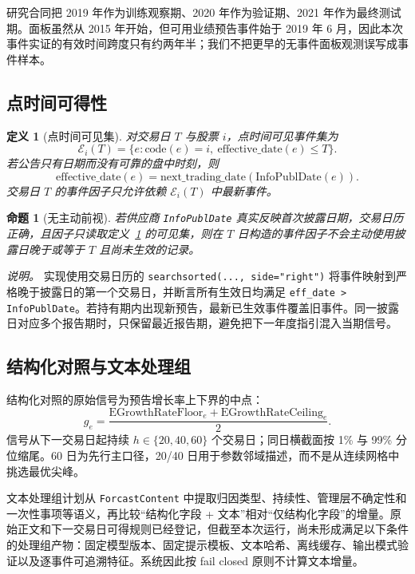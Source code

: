 \documentclass[UTF8,zihao=-4]{ctexart}
\newcommand{\code}[1]{\texttt{#1}}
\theoremstyle{accentthm}
\newtheorem{definition}{定义}
\newtheorem{proposition}{命题}
\begin{document}
研究合同把 2019 年作为训练观察期、2020 年作为验证期、2021 年作为最终测试期。面板虽然从 2015 年开始，但可用业绩预告事件始于 2019 年 6 月，因此本次事件实证的有效时间跨度只有约两年半；我们不把更早的无事件面板观测误写成事件样本。

\subsection{点时间可得性}

\begin{definition}[点时间可见集]\label{def:pit}
对交易日 $T$ 与股票 $i$，点时间可见事件集为
\[
  \mathcal{E}_{i}(T)=
  \{e:\text{code}(e)=i,\ \text{effective\_date}(e)\le T\}.
\]
若公告只有日期而没有可靠的盘中时刻，则
\[
  \text{effective\_date}(e)=
  \text{next\_trading\_date}(\text{InfoPublDate}(e)).
\]
交易日 $T$ 的事件因子只允许依赖 $\mathcal{E}_{i}(T)$ 中最新事件。
\end{definition}

\begin{proposition}[无主动前视]\label{prop:noleak}
若供应商 \code{InfoPublDate} 真实反映首次披露日期，交易日历正确，且因子只读取定义~\ref{def:pit} 的可见集，则在 $T$ 日构造的事件因子不会主动使用披露日晚于或等于 $T$ 且尚未生效的记录。
\end{proposition}

\noindent\emph{说明。} 实现使用交易日历的 \code{searchsorted(..., side="right")} 将事件映射到严格晚于披露日的第一个交易日，并断言所有生效日均满足 \code{eff\_date > InfoPublDate}。若持有期内出现新预告，最新已生效事件覆盖旧事件。同一披露日对应多个报告期时，只保留最近报告期，避免把下一年度指引混入当期信号。

\subsection{结构化对照与文本处理组}

结构化对照的原始信号为预告增长率上下界的中点：
\[
  g_e=\frac{\text{EGrowthRateFloor}_e+\text{EGrowthRateCeiling}_e}{2}.
\]
信号从下一交易日起持续 $h\in\{20,40,60\}$ 个交易日；同日横截面按 1\% 与 99\% 分位缩尾。60 日为先行主口径，20/40 日用于参数邻域描述，而不是从连续网格中挑选最优尖峰。

文本处理组计划从 \code{ForcastContent} 中提取归因类型、持续性、管理层不确定性和一次性事项等语义，再比较“结构化字段 + 文本”相对“仅结构化字段”的增量。原始正文和下一交易日可得规则已经登记，但截至本次运行，尚未形成满足以下条件的处理组产物：固定模型版本、固定提示模板、文本哈希、离线缓存、输出模式验证以及逐事件可追溯特征。系统因此按 fail closed 原则不计算文本增量。
\end{document}
